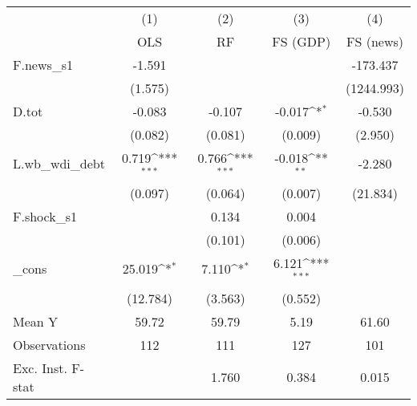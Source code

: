 {
\def\sym#1{\ifmmode^{#1}\else\(^{#1}\)\fi}
\begin{tabular}{l*{4}{c}}
\toprule
            &\multicolumn{1}{c}{(1)}&\multicolumn{1}{c}{(2)}&\multicolumn{1}{c}{(3)}&\multicolumn{1}{c}{(4)}\\
            &\multicolumn{1}{c}{OLS}&\multicolumn{1}{c}{RF}&\multicolumn{1}{c}{FS (GDP)}&\multicolumn{1}{c}{FS (news)}\\
\midrule
F.news\_s1   &      -1.591         &                     &                     &    -173.437         \\
            &     (1.575)         &                     &                     &  (1244.993)         \\
\addlinespace
D.tot       &      -0.083         &      -0.107         &      -0.017\sym{*}  &      -0.530         \\
            &     (0.082)         &     (0.081)         &     (0.009)         &     (2.950)         \\
\addlinespace
L.wb\_wdi\_debt&       0.719\sym{***}&       0.766\sym{***}&      -0.018\sym{**} &      -2.280         \\
            &     (0.097)         &     (0.064)         &     (0.007)         &    (21.834)         \\
\addlinespace
F.shock\_s1  &                     &       0.134         &       0.004         &                     \\
            &                     &     (0.101)         &     (0.006)         &                     \\
\addlinespace
\_cons      &      25.019\sym{*}  &       7.110\sym{*}  &       6.121\sym{***}&                     \\
            &    (12.784)         &     (3.563)         &     (0.552)         &                     \\
\midrule
Mean Y      &       59.72         &       59.79         &        5.19         &       61.60         \\
Observations&         112         &         111         &         127         &         101         \\
Exc. Inst. F-stat&                     &       1.760         &       0.384         &       0.015         \\
\bottomrule
\end{tabular}
}

